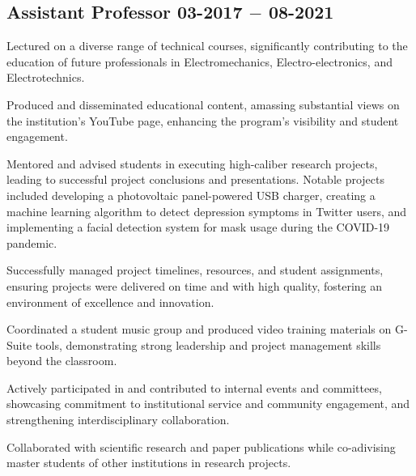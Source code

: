 \subsection{{Assistant Professor \hfill 03-2017 $-$ 08-2021}}
\begin{zitemize}
\item Lectured on a diverse range of technical courses, significantly contributing to the education of future professionals in Electromechanics, Electro-electronics, and Electrotechnics. 
\item Produced and disseminated educational content, amassing substantial views on the institution's YouTube page, enhancing the program's visibility and student engagement.
\item Mentored and advised students in executing high-caliber research projects, leading to successful project conclusions and presentations. Notable projects included developing a photovoltaic panel-powered USB charger, creating a machine learning algorithm to detect depression symptoms in Twitter users, and implementing a facial detection system for mask usage during the COVID-19 pandemic.
\item Successfully managed project timelines, resources, and student assignments, ensuring projects were delivered on time and with high quality, fostering an environment of excellence and innovation.
\item Coordinated a student music group and produced video training materials on G-Suite tools, demonstrating strong leadership and project management skills beyond the classroom.
\item Actively participated in and contributed to internal events and committees, showcasing commitment to institutional service and community engagement, and strengthening interdisciplinary collaboration.
\item Collaborated with scientific research and paper publications while co-adivising master students of other institutions in research projects.
\end{zitemize}



